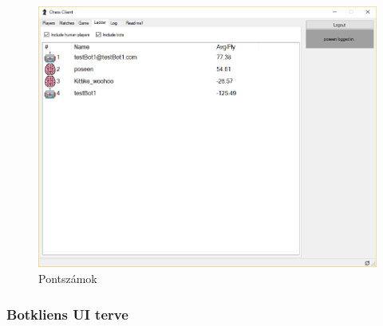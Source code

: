 \documentclass[twoside, a4paper, 12pt]{article}
\begin{document}
\begin{figure}[htbp]
	\centering
	\includegraphics[width=1\textwidth]{img/humanClientLadder.png}
	\caption{Pontszámok}
	\label{fig:humanClientLadder}
\end{figure}


\subsubsection{Botkliens UI terve}
\end{document}

